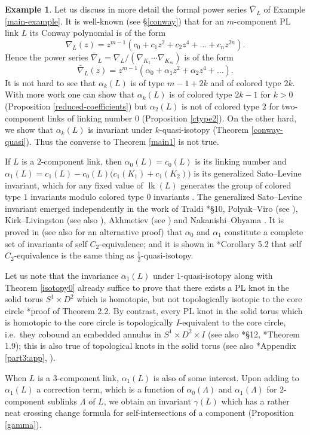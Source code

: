 \documentclass[a4paper,12pt,reqno,oneside]{amsart} %
\theoremstyle{plain}
\theoremstyle{definition}
\newtheorem{example}[theorem]{Example}
\theoremstyle{named}
\def\x{\times}
\renewcommand{\:}{\colon}
\DeclareMathOperator{\lk}{lk}
\begin{document}
\begin{example} \label{conway-ex}
Let us discuss in more detail the formal power series $\bar\nabla_L$ of Example \ref{main-example}.
It is well-known (see \S\ref{conway}) that for an $m$-component PL link $L$ its Conway polynomial is of the form 
\[\nabla_L(z)=z^{m-1}(c_0+c_1z^2+c_2z^4+\dots+c_nz^{2n}).\]
Hence the power series $\bar\nabla_L=\nabla_L/(\nabla_{K_1}\cdots\nabla_{K_m})$ is of the form \[\bar\nabla_L(z)=z^{m-1}(\alpha_0+\alpha_1z^2+\alpha_2z^4+\dots).\]
It is not hard to see that $\alpha_k(L)$ is of type $m-1+2k$ and of colored type $2k$. 
With more work one can show that $\alpha_k(L)$ is of colored type $2k-1$ for $k>0$ (Proposition \ref{reduced-coefficients}) 
but $\alpha_2(L)$ is not of colored type $2$ for two-component links of linking number $0$ (Proposition \ref{ctype2}).
On the other hard, we show that $\alpha_k(L)$ is invariant under $k$-quasi-isotopy (Theorem \ref{conway-quasi}). 
Thus the converse to Theorem \ref{main1} is not true.

If $L$ is a $2$-component link, then $\alpha_0(L)=c_0(L)$ is its linking number and 
$\alpha_1(L)=c_1(L)-c_0(L)\big(c_1(K_1)+c_1(K_2)\big)$ is its generalized Sato--Levine invariant, which for any fixed value of $\lk(L)$
generates the group of colored type $1$ invariants modulo colored type $0$ invariants \cite{KL}.
The generalized Sato--Levine invariant emerged independently in the work of Traldi \cite{Tr2}*{\S10}, Polyak--Viro (see \cite{AMR}),
Kirk--Livingston \cite{KL} (see also \cite{Liv}), Akhmetiev (see \cite{AR}) and Nakanishi--Ohyama \cite{NO}.
It is proved in \cite{NO} (see also \cite{M18} for an alternative proof) that $\alpha_0$ and $\alpha_1$ constitute a complete set of 
invariants of self $C_2$-equivalence; and it is shown in \cite{M18}*{Corollary 5.2} that self $C_2$-equivalence is the same thing as 
$\frac12$-quasi-isotopy.

Let us note that the invariance $\alpha_1(L)$ under $1$-quasi-isotopy along with Theorem \ref{isotopy0} already suffice to prove that 
there exists a PL knot in the solid torus $S^1\x D^2$ which is homotopic, but not topologically isotopic to the core circle 
\cite{MR1}*{proof of Theorem 2.2}.
By contrast, every PL knot in the solid torus which is homotopic to the core circle is topologically $I$-equivalent to the core circle, 
i.e.\ they cobound an embedded annulus in $S^1\x D^2\x I$ \cite{Gi1} (see also \cite{Da}*{\S12}, \cite{Hi}*{Theorem 1.9}); this is also 
true of topological knots in the solid torus \cite{Gi2} (see also \cite{M24-3}*{Appendix \ref{part3:app}},
\cite{An0}). 

When $L$ is a $3$-component link, $\alpha_1(L)$ is also of some interest.
Upon adding to $\alpha_1(L)$ a correction term, which is a function of $\alpha_0(\Lambda)$ and $\alpha_1(\Lambda)$ for $2$-component
sublinks $\Lambda$ of $L$, we obtain an invariant $\gamma(L)$ which has a rather neat crossing change formula for self-intersections
of a component (Proposition \ref{gamma}).
\end{example}
\end{document}
